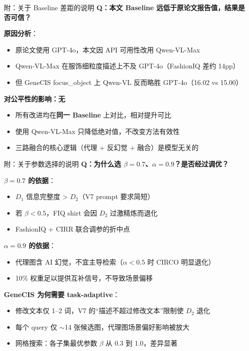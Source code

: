 \documentclass[aspectratio=169,12pt]{beamer}
\begin{document}
\begin{frame}[shrink=5]{附：关于 Baseline 差距的说明}
\scriptsize
\textbf{Q：本文 Baseline 远低于原论文报告值，结果是否可信？}

\vspace{0.3em}
\textbf{原因分析}：
\begin{itemize}\scriptsize
  \item 原论文使用 GPT-4o，本文因 API 可用性改用 Qwen-VL-Max
  \item Qwen-VL-Max 在服饰细粒度描述上不及 GPT-4o（FashionIQ 差约 14pp）
  \item 但 GeneCIS focus\_object 上 Qwen-VL 反而略胜 GPT-4o（16.02 vs 15.00）
\end{itemize}

\vspace{0.3em}
\textbf{对公平性的影响：无}
\begin{itemize}\scriptsize
  \item 所有改进均在\textbf{同一 Baseline} 上对比，相对提升可比
  \item 使用 Qwen-VL-Max 只降低绝对值，不改变方法有效性
  \item 三路融合的核心逻辑（代理 + 反幻觉 + 融合）是模型无关的
\end{itemize}
\end{frame}

\begin{frame}{附：关于参数选择的说明}
\scriptsize
\textbf{Q：为什么选 $\beta=0.7$、$\alpha=0.9$？是否经过调优？}

\vspace{0.3em}
\textbf{$\beta=0.7$ 的依据}：
\begin{itemize}\scriptsize
  \item $D_1$ 信息完整度 > $D_2$（V7 prompt 要求简短）
  \item 若 $\beta < 0.5$，FIQ shirt 会因 $D_2$ 过激精炼而退化
  \item FashionIQ + CIRR 联合调参的折中点
\end{itemize}

\vspace{0.3em}
\textbf{$\alpha=0.9$ 的依据}：
\begin{itemize}\scriptsize
  \item 代理图含 AI 幻觉，不宜主导检索（$\alpha < 0.5$ 时 CIRCO 明显退化）
  \item 10\% 权重足以提供互补信号，不导致场景偏移
\end{itemize}

\vspace{0.3em}
\textbf{GeneCIS 为何需要 task-adaptive}：
\begin{itemize}\scriptsize
  \item 修改文本仅 1--2 词，V7 的``描述不超过修改文本''限制使 $D_2$ 退化
  \item 每个 query 仅 $\sim$14 张候选图，代理图场景偏好影响被放大
  \item 网格搜索：各子集最优参数 $\beta$ 从 0.3 到 1.0，差异显著
\end{itemize}
\end{frame}
\end{document}
